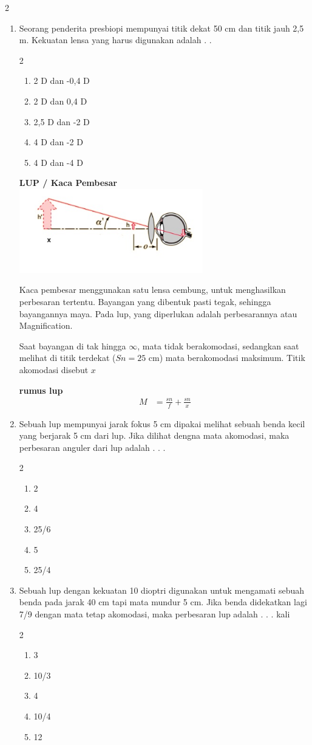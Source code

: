\documentclass[10pt,a4paper]{extarticle}
\newcommand{\pilgani}[1]{                            \vspace{-0.3cm}\begin{multicols}{2}
 \begin{enumerate}[label=\Alph*., itemsep=0pt,topsep=0pt,leftmargin=*,align=Center]#1                     \end{enumerate}
 \phantom{ini cuma sapi, wedus, dan ayam}
 \end{multicols}}
\begin{document}
\begin{multicols*}{2}
\begin{enumerate}
\item Seorang penderita presbiopi mempunyai titik dekat 50 cm dan titik jauh 2,5 m. Kekuatan lensa yang harus digunakan adalah . . 
\pilgani{
	\item 2 D dan -0,4 D
	\item 2 D dan 0,4 D
	\item 2,5 D dan -2 D
	\item 4 D dan -2 D
	\item 4 D dan -4 D }
\vspace{5cm}


\textbf{LUP /  Kaca Pembesar}\\
\includegraphics[width=8cm]{pic/lup}

Kaca pembesar menggunakan satu lensa cembung, untuk menghasilkan perbesaran tertentu. Bayangan yang dibentuk pasti tegak, sehingga bayangannya maya. Pada lup, yang diperlukan adalah perbesarannya atau Magnification. 

Saat bayangan di tak hingga $\infty$, mata tidak berakomodasi, sedangkan saat melihat di titik terdekat ($Sn = 25$ cm) mata berakomodasi maksimum. Titik akomodasi disebut $x$

\textbf{rumus lup}
\begin{align*}
M &= \frac{sn}{f} + \frac{sn}{x}
\end{align*}

\item Sebuah lup mempunyai jarak fokus 5 cm dipakai melihat sebuah benda kecil yang berjarak 5 cm dari lup. Jika dilihat dengna mata akomodasi, maka perbesaran anguler dari lup adalah . . .
\pilgani{
	\item 2
	\item 4
	\item 25/6
	\item 5
	\item 25/4}
\vspace{2cm}

\item Sebuah lup dengan kekuatan 10 dioptri digunakan untuk mengamati sebuah benda pada jarak 40 cm tapi mata mundur 5 cm. Jika benda didekatkan lagi 7/9 dengan mata tetap akomodasi, maka perbesaran lup adalah . . . kali
\pilgani{
	\item 3
	\item 10/3
	\item 4
	\item 10/4
	\item 12 }
\vspace{2cm}


\end{enumerate}
\end{multicols*}
\end{document}
